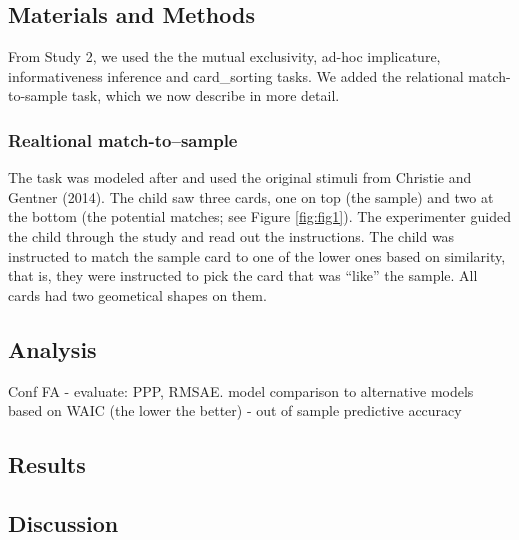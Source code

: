 \documentclass[
  english,
  man,floatsintext]{apa6}
\begin{document}
\hypertarget{materials-and-methods}{%
\subsection{Materials and Methods}\label{materials-and-methods}}

From Study 2, we used the the mutual exclusivity, ad-hoc implicature, informativeness inference and card\_sorting tasks. We added the relational match-to-sample task, which we now describe in more detail.

\hypertarget{realtional-match-tosample}{%
\subsubsection{Realtional match-to--sample}\label{realtional-match-tosample}}

The task was modeled after and used the original stimuli from Christie and Gentner (2014). The child saw three cards, one on top (the sample) and two at the bottom (the potential matches; see Figure \ref{fig:fig1}). The experimenter guided the child through the study and read out the instructions. The child was instructed to match the sample card to one of the lower ones based on similarity, that is, they were instructed to pick the card that was ``like'' the sample. All cards had two geometical shapes on them.

\hypertarget{analysis-2}{%
\subsection{Analysis}\label{analysis-2}}

Conf FA - evaluate: PPP, RMSAE. model comparison to alternative models based on WAIC (the lower the better) - out of sample predictive accuracy

\hypertarget{results-2}{%
\subsection{Results}\label{results-2}}

\hypertarget{discussion-2}{%
\subsection{Discussion}\label{discussion-2}}
\end{document}
